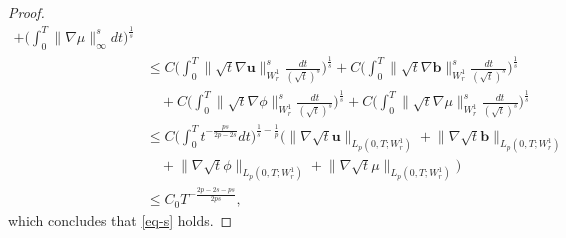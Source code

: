\documentclass[10pt,a4paper]{amsart}
\begin{document}
\begin{proof}
\begin{equation*}
\begin{split}
+\big( \int_0^T \big\lVert \nabla\mu \big\rVert_\infty^s dt \big)^{\frac{1}{s}}  \\
&\leq C \big( \int_0^T \big\lVert \sqrt{t} \nabla \mathbf{u} \big\rVert_{W_r^1}^s \frac{dt}{(\sqrt{t})^s} \big)^{\frac{1}{s}} + C \big( \int_0^T \big\lVert \sqrt{t} \nabla \mathbf{b} \big\rVert_{W_r^1}^s \frac{dt}{(\sqrt{t})^s} \big)^{\frac{1}{s}} \\&\quad+ C \big( \int_0^T \big\lVert \sqrt{t} \nabla \phi \big\rVert_{W_r^1}^s \frac{dt}{(\sqrt{t})^s} \big)^{\frac{1}{s}}
+C \big( \int_0^T \big\lVert \sqrt{t} \nabla \mu \big\rVert_{W_r^1}^s \frac{dt}{(\sqrt{t})^s} \big)^{\frac{1}{s}} \\
&\leq C \big( \int_0^T t^{-\frac{ps}{2p - 2s}} dt \big)^{\frac{1}{s} - \frac{1}{p}} \big( \big\lVert \nabla \sqrt{t} \mathbf{u} \big\rVert_{L_p(0,T;W_r^1)} + \big\lVert \nabla \sqrt{t} \mathbf{b} \big\rVert_{L_p(0,T;W_r^1)} \\&\quad+ \big\lVert \nabla \sqrt{t} \phi \big\rVert_{L_p(0,T;W_r^1)}+\big\lVert \nabla \sqrt{t} \mu \big\rVert_{L_p(0,T;W_r^1)}  \big) \\
&\leq C_{0} T^{-\frac{2p - 2s - ps}{2ps}},
\end{split}
\end{equation*}
which concludes that \eqref{eq-s} holds.
\end{proof}
\end{document}
